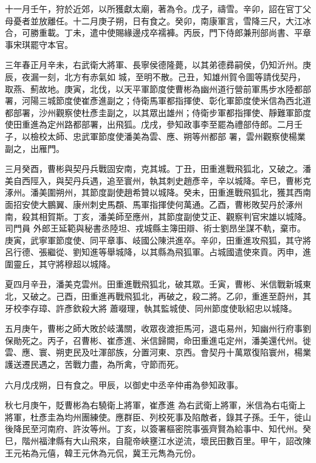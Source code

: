 \begin{pinyinscope}
 十一月壬午，狩於近郊，以所獲獻太廟，著為令。戊子，禱雪。辛卯，詔在官丁父母憂者並放離任。十二月庚子朔，日有食之。癸卯，南康軍言，雪降三尺，大江冰合，可勝重載。丁未，遣中使賜緣邊戍卒襦褲。丙辰，門下侍郎兼刑部尚書、平章事宋琪罷守本官。



 三年春正月辛未，右武衛大將軍、長寧侯德隆薨，以其弟德彞嗣侯，仍知沂州。庚辰，夜漏一刻，北方有赤氣如
 城，至明不散。己丑，知雄州賀令圖等請伐契丹，取燕、薊故地。庚寅，北伐，以天平軍節度使曹彬為幽州道行營前軍馬步水陸都部署，河陽三城節度使崔彥進副之；侍衛馬軍都指揮使、彰化軍節度使米信為西北道都部署，沙州觀察使杜彥圭副之，以其眾出雄州；侍衛步軍都指揮使、靜難軍節度使田重進為定州路都部署，出飛狐。戊戌，參知政事李至罷為禮部侍郎。二月壬子，以檢校太師、忠武軍節度使潘美為雲、應、朔等州都部
 署，雲州觀察使楊業副之，出雁門。



 三月癸酉，曹彬與契丹兵戰固安南，克其城。丁丑，田重進戰飛狐北，又破之。潘美自西陘入，與契丹兵遇，追至寰州，執其刺史趙彥辛，辛以城降。辛巳，曹彬克涿州。潘美圍朔州，其節度副使趙希贊以城降。癸未，田重進戰飛狐北，獲其西南面招安使大鵬翼、康州刺史馬頵、馬軍指揮使何萬通。乙酉，曹彬敗契丹於涿州南，殺其相賀斯。丁亥，潘美師至應州，其節度副使艾正、觀察判官宋雄以城降。司門員
 外郎王延範與秘書丞陸坦、戎城縣主簿田辯、術士劉昂坐謀不軌，棄市。庚寅，武寧軍節度使、同平章事、岐國公陳洪進卒。辛卯，田重進攻飛狐，其守將呂行德、張繼從、劉知進等舉城降，以其縣為飛狐軍。占城國遣使來貢。丙申，進圍靈丘，其守將穆超以城降。



 夏四月辛丑，潘美克雲州。田重進戰飛狐北，破其眾。壬寅，曹彬、米信戰新城東北，又破之。己酉，田重進再戰飛狐北，再破之，殺二將。乙卯，重進至蔚州，其牙校李存璋、許彥欽殺大將
 蕭啜理，執其監城使、同州節度使耿紹忠以城降。



 五月庚午，曹彬之師大敗於岐溝關，收眾夜渡拒馬河，退屯易州，知幽州行府事劉保勛死之。丙子，召曹彬、崔彥進、米信歸闕，命田重進屯定州，潘美還代州。徙雲、應、寰、朔吏民及吐渾部族，分置河東、京西。會契丹十萬眾復陷寰州，楊業護送遷民遇之，苦戰力盡，為所禽，守節而死。



 六月戊戌朔，日有食之。甲辰，以御史中丞辛仲甫為參知政事。



 秋七月庚午，貶曹彬為右驍衛上將軍，崔彥進
 為右武衛上將軍，米信為右屯衛上將軍，杜彥圭為均州團練使。應群臣、列校死事及陷敵者，錄其子孫。壬午，徙山後降民至河南府、許汝等州。丁亥，以簽署樞密院事張齊賢為給事中、知代州。癸巳，階州福津縣有大山飛來，自龍帝峽壅江水逆流，壞民田數百里。甲午，詔改陳王元祐為元僖，韓王元休為元侃，冀王元雋為元份。




\end{pinyinscope}
